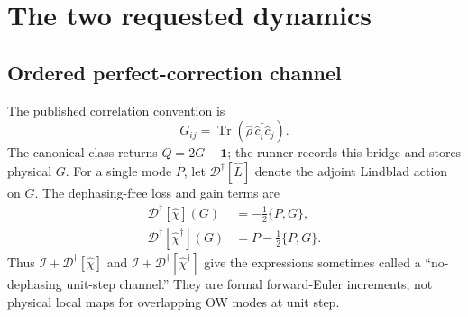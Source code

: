\documentclass[aps,prb,twocolumn,nofootinbib,superscriptaddress,floatfix]{revtex4-2}
\newcommand{\Tr}{\operatorname{Tr}}
\newcommand{\Diss}{\mathcal D}
\newcommand{\id}{\mathbf{1}}
\begin{document}
\section{The two requested dynamics}

\subsection{Ordered perfect-correction channel}

The published correlation convention is
\begin{equation}
 G_{ij}=\Tr(\hat\rho\,\hat c_i^\dagger\hat c_j).
\end{equation}
The canonical class returns $Q=2G-\id$; the runner records this bridge and stores
physical $G$.  For a single mode $P$, let $\Diss^\dagger[\hat L]$ denote the
adjoint Lindblad action on $G$.  The dephasing-free loss and gain terms are
\begin{align}
 \Diss^\dagger[\hat\chi](G)&=-\tfrac12\{P,G\},\\
 \Diss^\dagger[\hat\chi^\dagger](G)&=P-\tfrac12\{P,G\}.
 \label{eq:localnodeph}
\end{align}
Thus $\mathcal I+\Diss^\dagger[\hat\chi]$ and
$\mathcal I+\Diss^\dagger[\hat\chi^\dagger]$ give the expressions sometimes called a
``no-dephasing unit-step channel.''  They are formal forward-Euler increments, not
physical local maps for overlapping OW modes at unit step.
\end{document}
